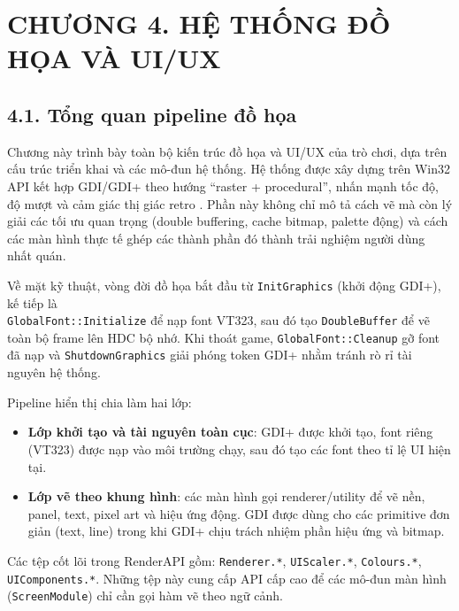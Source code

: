 \newpage
\chapter*{\centering CHƯƠNG 4. HỆ THỐNG ĐỒ HỌA VÀ UI/UX}
\setlength{\parindent}{1.5em}

\section*{4.1. Tổng quan pipeline đồ họa}

\setlength{\parindent}{1.5em} Chương này trình bày toàn bộ kiến trúc đồ họa và UI/UX của trò chơi, dựa trên cấu trúc triển khai và các mô-đun hệ thống. Hệ thống được xây dựng trên Win32 API kết hợp GDI/GDI+ theo hướng ``raster + procedural'', nhấn mạnh tốc độ, độ mượt và cảm giác thị giác retro \cite{ms_windows_gdi}. Phần này không chỉ mô tả cách vẽ mà còn lý giải các tối ưu quan trọng (double buffering, cache bitmap, palette động) và cách các màn hình thực tế ghép các thành phần đó thành trải nghiệm người dùng nhất quán.

\setlength{\parindent}{1.5em} Về mặt kỹ thuật, vòng đời đồ họa bắt đầu từ \texttt{InitGraphics} (khởi động GDI+), kế tiếp là \\ \texttt{GlobalFont::Initialize} để nạp font VT323, sau đó tạo \texttt{DoubleBuffer} để vẽ toàn bộ frame lên HDC bộ nhớ. Khi thoát game, \texttt{GlobalFont::Cleanup} gỡ font đã nạp và \texttt{ShutdownGraphics} giải phóng token GDI+ nhằm tránh rò rỉ tài nguyên hệ thống.

\setlength{\parindent}{1.5em} Pipeline hiển thị chia làm hai lớp:
\begin{itemize}
  \item \textbf{Lớp khởi tạo và tài nguyên toàn cục}: GDI+ được khởi tạo, font riêng (VT323) được nạp vào môi trường chạy, sau đó tạo các font theo tỉ lệ UI hiện tại.
  \item \textbf{Lớp vẽ theo khung hình}: các màn hình gọi renderer/utility để vẽ nền, panel, text, pixel art và hiệu ứng động. GDI được dùng cho các primitive đơn giản (text, line) trong khi GDI+ chịu trách nhiệm phần hiệu ứng và bitmap.
\end{itemize}

\setlength{\parindent}{1.5em} Các tệp cốt lõi trong RenderAPI gồm: \texttt{Renderer.*}, \texttt{UIScaler.*}, \texttt{Colours.*}, \texttt{UIComponents.*}. Những tệp này cung cấp API cấp cao để các mô-đun màn hình (\texttt{ScreenModule}) chỉ cần gọi hàm vẽ theo ngữ cảnh.

